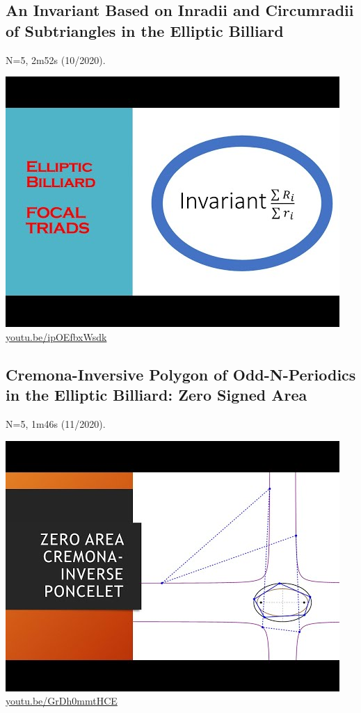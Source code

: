 \documentclass[12pt]{amsart}
\begin{document}
\subsection{An Invariant Based on Inradii and Circumradii of Subtriangles in the Elliptic Billiard}
\label{vid:ipOEfbxWsdk}
\noindent N=5, 2m52s (10/2020). 
\begin{center}\includegraphics[width=.5\textwidth]{pics/ipOEfbxWsdk.jpg} \\ 
\href{https://youtu.be/ipOEfbxWsdk}{\url{youtu.be/ipOEfbxWsdk}}\end{center}
% 

\subsection{Cremona-Inversive Polygon of Odd-N-Periodics in the Elliptic Billiard: Zero Signed Area}
\label{vid:GrDh0mmtHCE}
\noindent N=5, 1m46s (11/2020). 
\begin{center}\includegraphics[width=.5\textwidth]{pics/GrDh0mmtHCE.jpg} \\ 
\href{https://youtu.be/GrDh0mmtHCE}{\url{youtu.be/GrDh0mmtHCE}}\end{center}
% 
\end{document}
